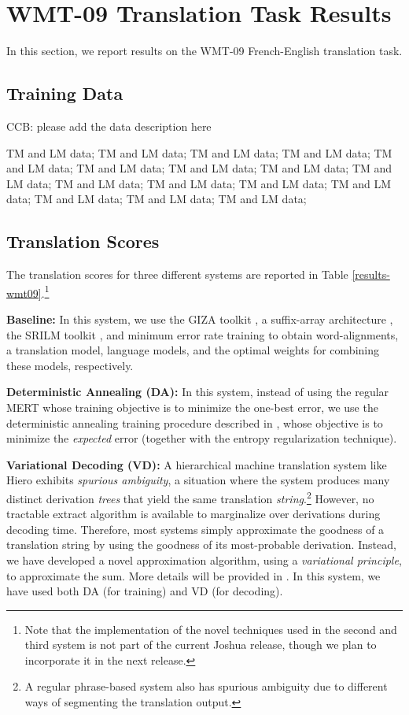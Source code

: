 \documentclass[11pt]{article}
\begin{document}
\section{WMT-09 Translation Task Results}
In this section, we report results on the WMT-09 French-English translation task.
\subsection{Training Data}
CCB: please add the data description here

TM and LM data; TM and LM data; TM and LM data; TM and LM data; TM and LM data; TM and LM data; TM and LM data; TM and LM data; TM and LM data; TM and LM data; TM and LM data; TM and LM data; TM and LM data; TM and LM data; TM and LM data; TM and LM data;


\subsection{Translation Scores}
The translation scores for three different systems are reported in Table \ref{results-wmt09}.\footnote{Note that the implementation of the novel techniques used in the second and third system is not part of the current Joshua release, though we plan to incorporate it in the next release.}


\textbf{Baseline: } In this system, we use the GIZA toolkit \cite{giza}, a suffix-array architecture \cite{adam-suffix}, the SRILM toolkit \cite{srilm}, and minimum error rate training \cite{discriminative-mert} to obtain word-alignments, a translation model, language models, and the optimal weights for combining these models, respectively.

\textbf{Deterministic Annealing (DA): } In this system, instead of using the regular MERT \cite{discriminative-mert} whose training objective is to minimize the one-best error, we use the deterministic annealing training procedure described in , whose objective is to minimize the \emph{expected} error (together with the entropy regularization technique).

\textbf{Variational Decoding (VD): }  A hierarchical machine translation system like Hiero exhibits \emph{spurious ambiguity}, a situation where the system
produces many distinct derivation \emph{trees} that yield the same translation \emph{string}.\footnote{A regular phrase-based system also has spurious ambiguity due to different ways of segmenting the translation output.} However, no tractable extract algorithm is available to marginalize over derivations during decoding time. Therefore, most systems simply approximate the goodness of a translation string by using the goodness of its most-probable derivation. Instead, we have developed a novel approximation algorithm, using a \emph{variational principle}, to approximate the sum.
More details will be provided in . In this system, we have used both DA (for training) and VD (for decoding).
\end{document}

